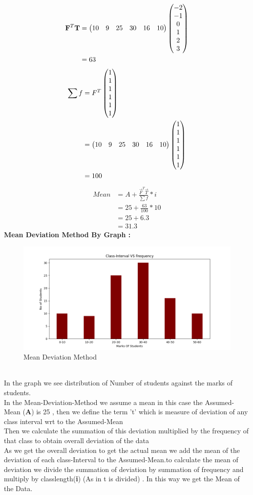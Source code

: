 \documentclass[journal,12pt,twocolumn]{IEEEtran}
\begin{document}
\begin{align}
\mathbf{F}^{T}\mathbf{T}  & =\begin{pmatrix}10 & 9 & 25 & 30 & 16 & 10\end{pmatrix}\begin{pmatrix}-2\\-1\\0\\1\\2\\3\end{pmatrix}\\ 
                    & = 63
\end{align}
\begin{align}
\sum f & = F^{T} \begin{pmatrix}1\\1\\1\\1\\1\\1\end{pmatrix}\\
	   & = \begin{pmatrix}10 & 9 & 25 & 30 & 16 & 10\end{pmatrix}\begin{pmatrix}1\\1\\1\\1\\1\\1\end{pmatrix}\\
       & = 100
\end{align}
\begin{align}
Mean & = A + \frac{ \vec{F}^{T}\vec{T} }{\sum f} * i\\
     & = 25 + \frac{63}{100} * 10\\
     & = 25 + 6.3\\
     & = 31.3
\end{align}
\textbf{Mean Deviation Method By Graph :}
\begin{figure}[h]
\centering
\includegraphics[width=\columnwidth]{Assig-1-figure.png}
\caption{Mean Deviation Method}
\label{Fig1}
\end{figure}\\
In the graph we see distribution of Number of students against the marks of students.\\In the Mean-Deviation-Method we assume a mean in this case the Assumed-Mean (\textbf{A}) is 25 , then we define the term 't' which is measure of deviation of any class interval wrt to the Assumed-Mean \\Then we calculate the summation of this deviation multiplied by the frequency of that class to obtain overall deviation of the data \\As we get the overall deviation to get the actual mean we add the mean of the deviation of each class-Interval to the Assumed-Mean.to calculate the mean of deviation we divide the summation of deviation by summation of frequency and multiply by classlength(\textbf{i}) (As in t is divided) . In this way we get the Mean of the Data.
\end{document}
